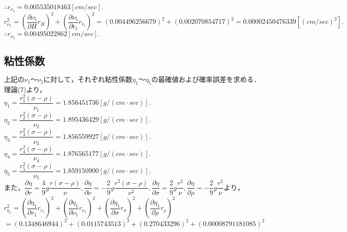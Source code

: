 \documentclass[a4paper,1pt]{jsarticle}
\begin{document}
$\therefore r_{\nu _4}=0.005535018463[cm/sec].$\\

$r_{\nu _5}^2=(\dfrac{\partial \nu _5}{\partial H}r_H)^2+(\dfrac{\partial \nu _5}{\partial t_5}r_{t_5})^2=(0.004496256679)^2+(0.002070854717)^2=0.00002450476339[(cm/sec)^2].$\\

$\therefore r_{\nu _5}=0.00495022862[cm/sec].$\\



\subsection*{粘性係数}
$上記の\nu _1〜\nu _5に対して，それぞれ粘性係数\eta _1〜\eta _5の最確値および確率誤差を求める．$\\

理論(7)より，\\

$\eta _1=\dfrac{r_1^2(\sigma -\rho )}{\nu _1}=1.856451736[g/(cm\cdot sec)].$\\

$\eta _2=\dfrac{r_2^2(\sigma -\rho )}{\nu _2}=1.895436429[g/(cm\cdot sec)].$\\

$\eta _3=\dfrac{r_3^2(\sigma -\rho )}{\nu _3}=1.856559927[g/(cm\cdot sec)].$\\

$\eta _4=\dfrac{r_4^2(\sigma -\rho )}{\nu _4}=1.876565177[g/(cm\cdot sec)].$\\

$\eta _5=\dfrac{r_5^2(\sigma -\rho )}{\nu _5}=1.859150900[g/(cm\cdot sec)].$\\

$また，\dfrac{\partial \eta }{\partial r}=\dfrac{4}{9}g\dfrac{r(\sigma -\rho  )}{\nu },\dfrac{\partial \eta }{\partial \nu }=-\dfrac{2}{9}g\dfrac{r^2(\sigma -\rho  )}{\nu^2 },\dfrac{\partial \eta }{\partial \sigma }=\dfrac{2}{9}g\dfrac{r^2}{\nu },\dfrac{\partial \eta }{\partial \rho }=-\dfrac{2}{9}g\dfrac{r^2}{\nu }より，$\\

$r_{\eta _1}^2=(\dfrac{\partial \eta _1}{\partial r_1}r_{r_1})^2+(\dfrac{\partial \eta _1}{\partial \nu _1}r_{\nu _1})^2+(\dfrac{\partial \eta _1}{\partial \sigma }r_\sigma)^2+(\dfrac{\partial \eta _1}{\partial \rho }r_\rho )^2$\\

$=(0.1348646944)^2+(0.0115743513)^2+(0.270433296)^2+(0.00008791181085)^2$\\
\end{document}
